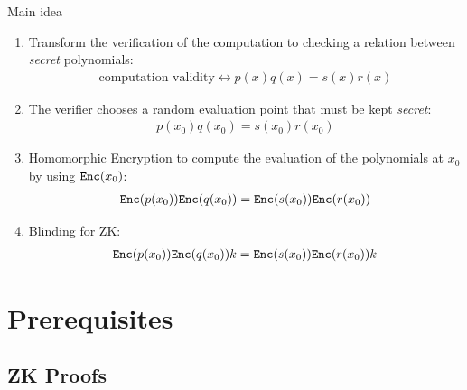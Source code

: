 \documentclass[handout]{beamer}
\begin{document}
\begin{frame}{Main idea} 
\begin{enumerate}
\item Transform the verification of the computation to checking a relation between \emph{secret} polynomials: 
\begin{align*}\textrm{computation validity} \leftrightarrow p(x)q(x)=s(x)r(x) \end{align*}
\item The verifier chooses a random evaluation point that must be kept \emph{secret}: 
\begin{align*} p(x_0)q(x_0)=s(x_0)r(x_0) \end{align*}
\item Homomorphic Encryption to compute the evaluation of the polynomials at $x_0$ by using $\mathtt{Enc}(x_0)$:
\begin{align*}\mathtt{Enc}(p(x_0))\mathtt{Enc}(q(x_0))=\mathtt{Enc}(s(x_0))\mathtt{Enc}(r(x_0))
\end{align*}
\item Blinding for ZK:
\begin{align*}
\mathtt{Enc}(p(x_0))\mathtt{Enc}(q(x_0)) k =\mathtt{Enc}(s(x_0))\mathtt{Enc}(r(x_0)) k 
\end{align*}
\end{enumerate}

\end{frame}

\section{Prerequisites}

\subsection{ZK Proofs}
\end{document}
